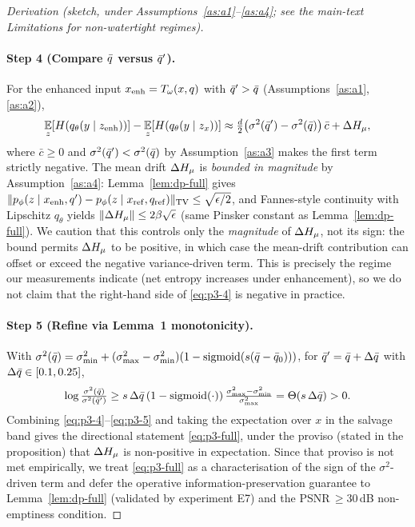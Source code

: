 \begin{proof}[Derivation (sketch, under Assumptions~\ref{as:a1}--\ref{as:a4}; see the
main-text Limitations for non-watertight regimes)]
\paragraph{Step 4 (Compare $\bar{q}$ versus $\bar{q}'$).}
For the enhanced input $x_{\mathrm{enh}}=T_\omega(x,q)$ with $\bar{q}'>\bar{q}$ (Assumptions~\ref{as:a1},
\ref{as:a2}),
\begin{equation}
\operatorname*{\mathbb{E}}_z[H(q_\theta(y\mid z_{\mathrm{enh}}))] - \operatorname*{\mathbb{E}}_z[H(q_\theta(y\mid z_x))]
\approx \tfrac{d}{2}\big(\sigma^2(\bar{q}') - \sigma^2(\bar{q})\big)\,\bar{c} + \Delta H_\mu,
\label{eq:p3-4}
\end{equation}
where $\bar{c}\geq 0$ and $\sigma^2(\bar{q}')<\sigma^2(\bar{q})$ by Assumption~\ref{as:a3} makes the
first term strictly negative. The mean drift $\Delta H_\mu$ is \emph{bounded in magnitude}
by Assumption~\ref{as:a4}: Lemma~\ref{lem:dp-full} gives
$\|p_\phi(z\mid x_{\mathrm{enh}},q') - p_\phi(z\mid x_{\mathrm{ref}},q_{\mathrm{ref}})\|_{\mathrm{TV}}
\leq \sqrt{\epsilon/2}$, and Fannes-style continuity with Lipschitz $q_\theta$ yields
$\|\Delta H_\mu\| \leq 2\beta\sqrt{\epsilon}$ (same Pinsker constant as Lemma~\ref{lem:dp-full}).
We caution that this controls only the \emph{magnitude} of $\Delta H_\mu$, not its sign:
the bound permits $\Delta H_\mu$ to be positive, in which case the mean-drift contribution
can offset or exceed the negative variance-driven term. This is precisely the regime our
measurements indicate (net entropy increases under enhancement), so we do not claim that the
right-hand side of \eqref{eq:p3-4} is negative in practice.

\paragraph{Step 5 (Refine via Lemma~1 monotonicity).}
With $\sigma^2(\bar{q})=\sigma_{\min}^2+(\sigma_{\max}^2-\sigma_{\min}^2)(1-\operatorname{sigmoid}(s(\bar{q}-\bar{q}_0)))$,
for $\bar{q}'=\bar{q}+\Delta\bar{q}$ with $\Delta\bar{q}\in[0.1,0.25]$,
\begin{equation}
\log\tfrac{\sigma^2(\bar{q})}{\sigma^2(\bar{q}')}
\geq s\,\Delta\bar{q}\,(1-\operatorname{sigmoid}(\cdot))\,\tfrac{\sigma_{\max}^2-\sigma_{\min}^2}{\sigma_{\max}^2}
= \Theta(s\,\Delta\bar{q}) > 0.
\label{eq:p3-5}
\end{equation}
Combining \eqref{eq:p3-4}--\eqref{eq:p3-5} and taking the expectation over $x$ in the
salvage band gives the directional statement \eqref{eq:p3-full}, under the proviso (stated in
the proposition) that $\Delta H_\mu$ is non-positive in expectation. Since that proviso is
not met empirically, we treat \eqref{eq:p3-full} as a characterisation of the sign of the
$\sigma^2$-driven term and defer the operative information-preservation guarantee to
Lemma~\ref{lem:dp-full} (validated by experiment E7) and the PSNR$\,\geq 30$\,dB
non-emptiness condition.
\end{proof}

